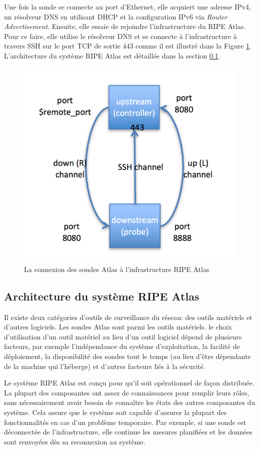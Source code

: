 Une fois la sonde se connecte au port d'Ethernet, elle acquiert  une adresse IPv4, un résolveur DNS  en utilisant DHCP et la configuration IPv6 via \textit{Router Advertisement}. Ensuite, elle essaie de rejoindre l'infrastructure du RIPE Atlas. Pour ce faire, elle utilise le résolveur DNS et se connecte à l'infrastructure à travers SSH sur le port TCP de sortie $443$ comme il est illustré dans la Figure \ref{fig:ssh-atlas-probe}. L'architecture du système RIPE Atlas est détaillée dans la section \ref{subsec:archi-probes}.

\begin{figure}[H]
	\centering
	\captionsetup{justification=centering}
	\includegraphics[width=0.5\linewidth]{illustrations/ssh-atlas-probe}
	\caption{La connexion des sondes Atlas à l'infrastructure RIPE Atlas \cite{how-we-manage-our-probe}}
	\label{fig:ssh-atlas-probe}
\end{figure}

\subsection{Architecture du système RIPE Atlas} \label{subsec:archi-probes}

Il existe deux catégories d'outils de surveillance du réseau: des outils matériels et d'autres logiciels. Les sondes  Atlas sont parmi les outils matériels. le choix d'utilisation d'un outil matériel au lieu d'un outil logiciel dépend de plusieurs facteurs, par exemple l'indépendance du système d'exploitation, la facilité de déploiement, la disponibilité des sondes tout le temps (au lieu d'être dépendante de la machine qui l'héberge) et d'autres facteurs liés à la sécurité.

Le système RIPE Atlas est conçu pour qu'il soit opérationnel de façon distribuée. La plupart des composantes ont assez de connaissances pour remplir leurs rôles, sans nécessairement avoir besoin de connaître les états des autres composantes du système. Cela assure que le système soit capable d'assurer la plupart des fonctionnalités en cas  d'un problème temporaire. Par exemple, si une sonde est déconnectée de l'infrastructure, elle continue les mesures planifiées et les données sont renvoyées dès sa reconnexion au système.


